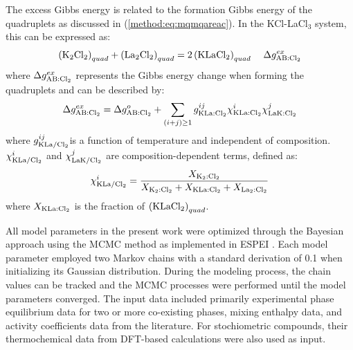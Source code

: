 The excess Gibbs energy is related to the formation Gibbs energy of the quadruplets as discussed in (\ref{method:eq:mqmqareac}). In the KCl-LaCl$_3$ system, this can be expressed as:
\begin{equation} \label{ms:eq:lamqmreac}
    \left(\rm K_2{\rm Cl}_2\right)_{quad}+\left({\rm La}_2{\rm Cl}_2\right)_{quad}=2\left(\rm KLa{\rm Cl}_2\right)_{quad}\;\;\;\;\Delta g_{\rm AB:Cl_2}^{ex}
\end{equation}
where $\Delta g_{\rm AB:Cl_2}^{ex}$ represents the Gibbs energy change when forming the quadruplets and can be described by: 
\begin{equation} \label{ms:eq:lamqmgex}
    \Delta g_{\rm AB:Cl_2}^{ex}=\Delta g_{\rm AB:Cl_2}^{o}+\sum_{(i+j)\geq1}{g_{\rm KLa:{\rm Cl}_2}^{ij}\chi_{\rm KLa:{\rm Cl}_2}^i\chi_{\rm LaK:{\rm Cl}_2}^j}
\end{equation}
where $g_{\rm KLa/{\rm Cl}_2}^{ij}$is a function of temperature and independent of composition. $\chi_{\rm KLa/{\rm Cl}_2}^i$ and $\chi_{\rm LaK/{\rm Cl}_2}^j$ are composition-dependent terms, defined as:
\begin{equation} \label{ms:eq:lamqmchi}
    \chi_{\rm KLa/{\rm Cl}_2}^i=\frac{X_{\rm K_2:Cl_2}}{X_{\rm K_2:Cl_2}+X_{\rm KLa:Cl_2}+X_{{\rm La}_2:{\rm Cl}_2}}
\end{equation}
where $X_{\rm KLa:Cl_2}$ is the fraction of $\left(\rm KLaCl_2\right)_{quad}$. 

All model parameters in the present work were optimized through the Bayesian approach using the MCMC method as implemented in ESPEI \cite{bocklund2019espei}. Each model parameter employed two Markov chains with a standard derivation of 0.1 when initializing its Gaussian distribution. During the modeling process, the chain values can be tracked and the MCMC processes were performed until the model parameters converged. The input data included primarily experimental phase equilibrium data for two or more co-existing phases, mixing enthalpy data, and activity coefficients data from the literature. For stochiometric compounds, their thermochemical data from DFT-based calculations were also used as input. 

